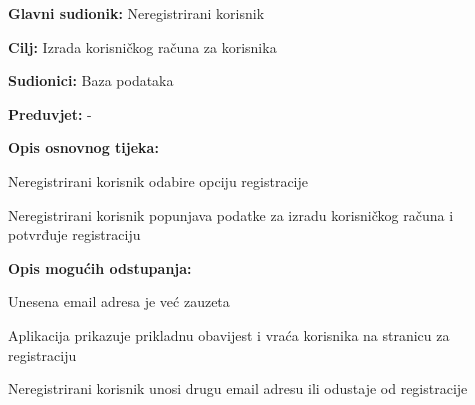				
				\noindent {}
				\begin{packed_item}
					
					\item \textbf{Glavni sudionik:} Neregistrirani korisnik
					\item  \textbf{Cilj:} Izrada korisničkog računa za korisnika
					\item  \textbf{Sudionici:} Baza podataka
					\item  \textbf{Preduvjet:} -
					
					\item  \textbf{Opis osnovnog tijeka:}
					\item[] \begin{packed_enum}
						\item Neregistrirani korisnik odabire opciju registracije
						\item Neregistrirani korisnik popunjava podatke za izradu korisničkog računa i potvrđuje registraciju
					\end{packed_enum}
					
					\item  \textbf{Opis mogućih odstupanja:}
					\item[] \begin{packed_item}
						\item[2.a] Unesena email adresa je već zauzeta
						\item[] \begin{packed_enum}
							\item Aplikacija prikazuje prikladnu obavijest i vraća korisnika na stranicu za registraciju
							\item Neregistrirani korisnik unosi drugu email adresu ili odustaje od registracije
						\end{packed_enum}
					\end{packed_item}
				\end{packed_item}
				
